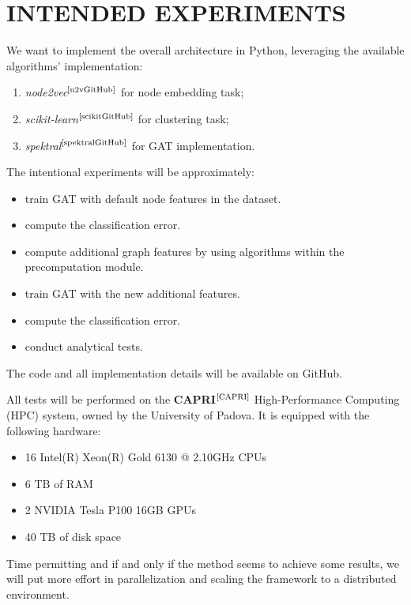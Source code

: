 \documentclass[12pt,conference]{ieeeconf} %
\begin{document}
\section{INTENDED EXPERIMENTS}
We want to implement the overall architecture in Python, leveraging the available algorithms' implementation: 
\begin{enumerate}
    \item \textit{node2vec}$^\text{\cite{n2vGitHub}}$ for node embedding task;
    \item \textit{scikit-learn}$^\text{\cite{scikitGitHub}}$ for clustering task;
    \item \textit{spektral}$^\text{\cite{spektralGitHub}}$ for GAT implementation.
\end{enumerate}
The intentional experiments will be approximately:
\begin{itemize}
    \item train GAT with default node features in the dataset.
    \item compute the classification error.
    \item compute additional graph features by using algorithms within the precomputation module.
    \item train GAT with the new additional features.
    \item compute the classification error.
    \item conduct analytical tests. 
\end{itemize}
The code and all implementation details will be available on GitHub. \par
All tests will be performed on the \textbf{CAPRI}$^\text{\cite{CAPRI}}$ High-Performance Computing (HPC) system, owned by the University of Padova. It is equipped with the following hardware:
\begin{itemize}
    \item 16 Intel(R) Xeon(R) Gold 6130 @ 2.10GHz CPUs
    \item 6 TB of RAM
    \item 2 NVIDIA Tesla P100 16GB GPUs
    \item 40 TB of disk space
\end{itemize}
Time permitting and if and only if the method seems to achieve some results, we will put more effort in parallelization and scaling the framework to a distributed environment.

\vspace{\fill}
\printbibliography
\end{document}
